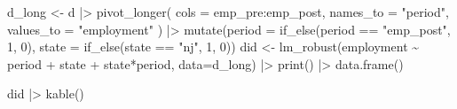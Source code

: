 \documentclass[
  12pt,
  letterpaper,
  DIV=11,
  numbers=noendperiod]{scrartcl}
\newenvironment{Shaded}{\begin{snugshade}}{\end{snugshade}}
\newcommand{\AttributeTok}[1]{\textcolor[rgb]{0.40,0.45,0.13}{#1}}
\newcommand{\DecValTok}[1]{\textcolor[rgb]{0.68,0.00,0.00}{#1}}
\newcommand{\FunctionTok}[1]{\textcolor[rgb]{0.28,0.35,0.67}{#1}}
\newcommand{\NormalTok}[1]{\textcolor[rgb]{0.00,0.23,0.31}{#1}}
\newcommand{\OtherTok}[1]{\textcolor[rgb]{0.00,0.23,0.31}{#1}}
\newcommand{\SpecialCharTok}[1]{\textcolor[rgb]{0.37,0.37,0.37}{#1}}
\newcommand{\StringTok}[1]{\textcolor[rgb]{0.13,0.47,0.30}{#1}}
\newcommand{\1}[1]{\mathds{1}\left[#1\right]}
\begin{document}
\begin{enumerate}
\begin{Shaded}
\begin{Highlighting}[]
\NormalTok{d\_long }\OtherTok{\textless{}{-}}\NormalTok{ d }\SpecialCharTok{|\textgreater{}}
  \FunctionTok{pivot\_longer}\NormalTok{(}
    \AttributeTok{cols =}\NormalTok{ emp\_pre}\SpecialCharTok{:}\NormalTok{emp\_post,}
    \AttributeTok{names\_to =} \StringTok{"period"}\NormalTok{,}
    \AttributeTok{values\_to =} \StringTok{"employment"}
\NormalTok{  ) }\SpecialCharTok{|\textgreater{}}
  \FunctionTok{mutate}\NormalTok{(}\AttributeTok{period =} \FunctionTok{if\_else}\NormalTok{(period }\SpecialCharTok{==} \StringTok{"emp\_post"}\NormalTok{, }\DecValTok{1}\NormalTok{, }\DecValTok{0}\NormalTok{),}
         \AttributeTok{state  =} \FunctionTok{if\_else}\NormalTok{(state }\SpecialCharTok{==} \StringTok{"nj"}\NormalTok{, }\DecValTok{1}\NormalTok{, }\DecValTok{0}\NormalTok{))}
\NormalTok{did }\OtherTok{\textless{}{-}}
  \FunctionTok{lm\_robust}\NormalTok{(employment }\SpecialCharTok{\textasciitilde{}}\NormalTok{ period }\SpecialCharTok{+}\NormalTok{ state }\SpecialCharTok{+}\NormalTok{ state}\SpecialCharTok{*}\NormalTok{period, }\AttributeTok{data=}\NormalTok{d\_long) }\SpecialCharTok{|\textgreater{}}
  \FunctionTok{print}\NormalTok{() }\SpecialCharTok{|\textgreater{}} \FunctionTok{data.frame}\NormalTok{() }
\end{Highlighting}
\end{Shaded}

\begin{Shaded}
\begin{Highlighting}[]
\NormalTok{did }\SpecialCharTok{|\textgreater{}} \FunctionTok{kable}\NormalTok{()}
\end{Highlighting}
\end{Shaded}


\end{enumerate}
\end{document}
